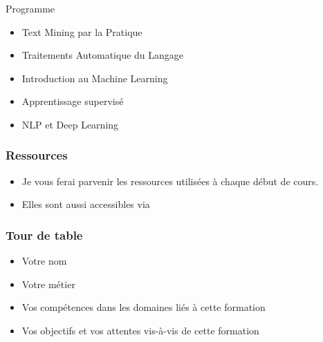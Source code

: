 \begin{frame}{Programme}
  \begin{itemize}
  \item Text Mining par la Pratique
  \item Traitements Automatique du Langage
  \item Introduction au Machine Learning
  \item Apprentissage supervisé
  \item NLP et Deep Learning
  \end{itemize}
\end{frame}

\begin{frame}
  \frametitle{Ressources}
  \begin{itemize}
  \item Je vous ferai parvenir les ressources utilisées à chaque début de cours.
  \item Elles sont aussi accessibles via 
  \end{itemize}
\end{frame}

\begin{frame}
  \frametitle{Tour de table}
  \begin{itemize}
  \item Votre nom
  \item Votre métier
  \item Vos compétences dans les domaines liés à cette formation
  \item Vos objectifs et vos attentes vis-à-vis de cette formation
  \end{itemize}
\end{frame}
